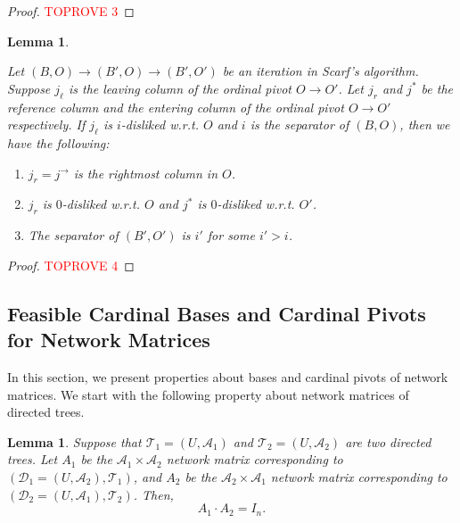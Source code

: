 \documentclass[11pt]{article}
\newtheorem{lemma}[theorem]{Lemma}
\begin{document}
\begin{proof}\textcolor{red}{TOPROVE 3}\end{proof}


\begin{lemma}\label{lem:Separator-Change}

    Let $(B,O)\to(B',O)\to(B',O')$ be an iteration in Scarf's algorithm. Suppose $j_\ell$ is the leaving column of the ordinal pivot $O\to O'$. Let $j_r$ and $j^*$ be the reference column and the entering column of the ordinal pivot $O\to O'$ respectively. If $j_\ell$ is $i$-disliked w.r.t. $O$ and $i$ is the separator of $(B, O)$, then we have the following:
\begin{enumerate}
        \item[(i)] $j_r=j^\rightarrow$ is the rightmost column in $O$.
        \item[(ii)] $j_r$ is $0$-disliked w.r.t. $O$ and $j^*$ is $0$-disliked w.r.t. $O'$.
        \item[(iii)] The separator of $(B',O')$ is $i'$ for some $i'>i$.
    \end{enumerate}
    
\end{lemma}


\begin{proof}\textcolor{red}{TOPROVE 4}\end{proof}




\subsection{Feasible Cardinal Bases and Cardinal Pivots for Network Matrices}\label{sec:Pivot-NM}
In this section, we present properties about bases and cardinal pivots of network matrices. We start with the following property about network matrices of directed trees. 
\begin{lemma}\label{lem:Base-Inverse}
    Suppose that $\mathcal{T}_1=(U,\mathcal{A}_1)$ and $\mathcal{T}_2=(U,\mathcal{A}_2)$ are two directed trees. Let $A_1$ be the $\mathcal{A}_1\times\mathcal{A}_2$ network matrix corresponding to $(\mathcal{D}_1=(U,\mathcal{A}_2),\mathcal{T}_1)$, and $A_2$ be the $\mathcal{A}_2\times\mathcal{A}_1$ network matrix corresponding to $(\mathcal{D}_2=(U,\mathcal{A}_1),\mathcal{T}_2)$. Then,
    \begin{equation}\label{eq:Base-Inverse}
        A_1\cdot A_2=I_n.
    \end{equation}
\end{lemma}
\end{document}
